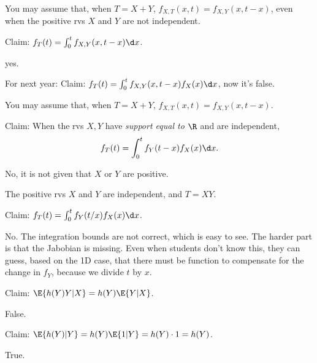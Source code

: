 \documentclass[tf-tutorial-all.tex]{subfiles}
\begin{document}
\begin{truefalse}
You may assume that, when $T=X+Y$, $f_{X,T}(x,t) = f_{X,Y}(x, t-x)$, even when the positive rvs $X$ and $Y$ are not independent.

Claim: $f_T(t)  = \int_{0}^{t} f_{X, Y}(x,t-x) \d x$.

\begin{solution}
yes.

For next year: Claim: $f_T(t)  = \int_{0}^{t} f_{X, Y}(x,t-x) f_{X}(x)\d x$, now it's false.
\end{solution}
\end{truefalse}

\begin{truefalse}
You may assume that, when $T=X+Y$, $f_{X,T}(x,t) = f_{X,Y}(x, t-x)$.

Claim: When the rvs $X, Y$ have \emph{support equal to $\R$} and are independent,
\begin{equation}
\label{eq:10}
f_T(t)  = \int_{0}^{t} f_{Y}(t-x) f_X(x) \d x.
\end{equation}

\begin{solution}
No, it is not given that $X$ or $Y$ are positive.
\end{solution}
\end{truefalse}


\begin{truefalse}
The positive rvs $X$ and $Y$ are independent, and $T=XY$.

Claim: $f_T(t)  = \int_{0}^{t} f_{Y}(t/x) f_X(x) \d x$.

\begin{solution}
No. The integration bounds are not correct, which is easy to see. The harder part is that the Jabobian is missing. Even when students don't know this, they can guess, based on the 1D case, that there must be function to compensate  for the change in $f_{Y}$, because we divide $t$ by $x$.
\end{solution}
\end{truefalse}

\begin{truefalse}
Claim: $\E{h(Y)Y | X} = h(Y) \E{Y|X}$.

\begin{solution}
False.
\end{solution}
\end{truefalse}


\begin{truefalse}
Claim: $\E{h(Y)|Y} = h(Y)\E{1|Y} = h(Y)\cdot 1 = h(Y)$.

\begin{solution}
True.
\end{solution}
\end{truefalse}
\end{document}
